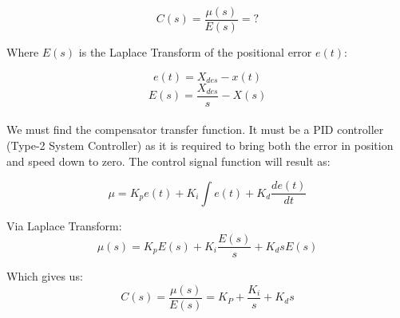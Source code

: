 \documentclass{article}
\begin{document}
{\[ C(s) = \frac{\mu(s)}{E(s)} = ? \]

Where $E(s)$ is the Laplace Transform of the positional error $e(t)$:

\[ e(t) = X_{des} - x(t) \]
\[ E(s) = \frac{X_{des}}{s} - X(s) \]
\\
We must find the compensator transfer function. It must be a PID controller (Type-2 System Controller) as it is required to bring both the error in position and speed down to zero. The control signal function will result as: 

\[\mu = K_pe(t) + K_i \int e(t) + K_d\frac{de(t)}{dt}\]

Via Laplace Transform:
\[\mu (s) = K_pE(s) + K_i \frac{E(s)}{s} + K_dsE(s)\]

Which gives us:
\[C(s) = \frac{\mu (s)}{E(s)} = K_P + \frac{K_i}{s} + K_ds\]
\\
}

\pagebreak 
\end{document}
